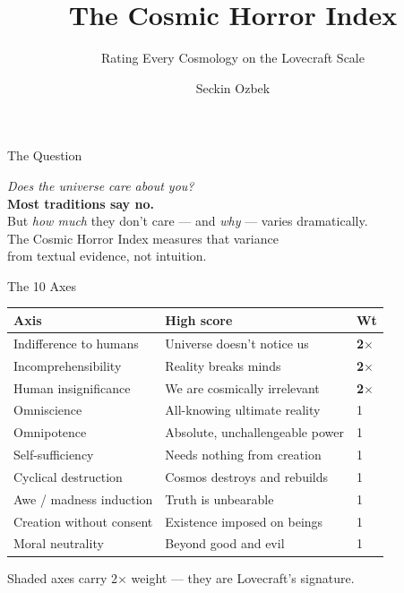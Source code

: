 \documentclass[10pt, aspectratio=169]{beamer}
\title{The Cosmic Horror Index}
\subtitle{Rating Every Cosmology on the Lovecraft Scale}
\author{Seckin Ozbek}
\date{}
\begin{document}
\maketitle

\begin{frame}{The Question}
  \vspace{1em}
  \begin{center}
    \large
    \textit{Does the universe care about you?}\\[1.2em]
    \textbf{\Large Most traditions say no.}\\[1.8em]
    \normalsize
    But \textit{how much} they don't care — and \textit{why} — varies dramatically.\\[0.8em]
    The Cosmic Horror Index measures that variance\\
    from textual evidence, not intuition.
  \end{center}
\end{frame}

\begin{frame}{The 10 Axes}
  \small
  \begin{center}
  \begin{tabular}{lll}
    \toprule
    \textbf{Axis} & \textbf{High score} & \textbf{Wt} \\
    \midrule
    \rowcolor{axisweight2}
    Indifference to humans       & Universe doesn't notice us    & \textbf{2$\times$} \\
    \rowcolor{axisweight2}
    Incomprehensibility          & Reality breaks minds          & \textbf{2$\times$} \\
    \rowcolor{axisweight2}
    Human insignificance         & We are cosmically irrelevant  & \textbf{2$\times$} \\
    Omniscience                  & All-knowing ultimate reality  & 1 \\
    Omnipotence                  & Absolute, unchallengeable power & 1 \\
    Self-sufficiency             & Needs nothing from creation   & 1 \\
    Cyclical destruction         & Cosmos destroys and rebuilds  & 1 \\
    Awe / madness induction      & Truth is unbearable           & 1 \\
    Creation without consent     & Existence imposed on beings   & 1 \\
    Moral neutrality             & Beyond good and evil          & 1 \\
    \bottomrule
  \end{tabular}
  \end{center}
  \vspace{0.3em}
  \small\textcolor{accent}{Shaded axes carry 2$\times$ weight — they are Lovecraft's signature.}
\end{frame}
\end{document}
